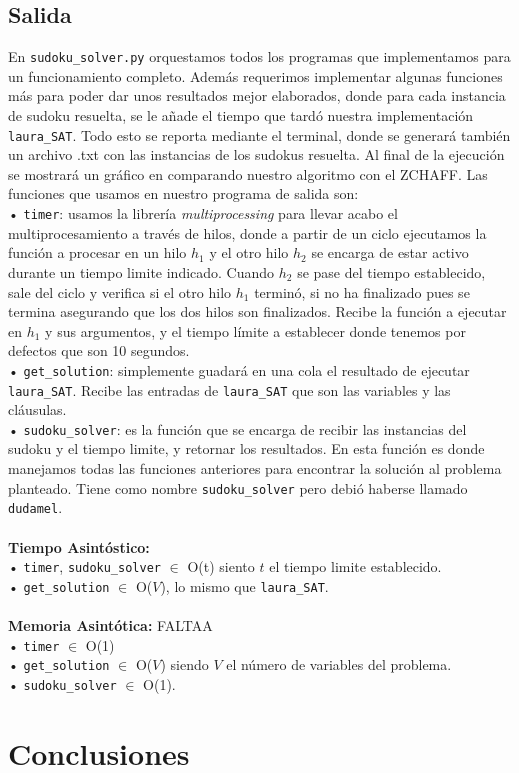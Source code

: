 \documentclass[letterpaper,12pt]{article}
\begin{document}
\subsection{Salida}

En \texttt{sudoku\_solver.py} orquestamos todos los programas que implementamos para un funcionamiento completo. Además requerimos implementar algunas funciones más para poder dar unos resultados mejor elaborados, donde para cada instancia de sudoku resuelta, se le añade el tiempo que tardó nuestra implementación \texttt{laura\_SAT}. Todo esto se reporta mediante el terminal, donde se generará también un archivo .txt con las instancias de los sudokus resuelta. Al final de la ejecución se mostrará un gráfico en comparando nuestro algoritmo con el ZCHAFF. Las funciones que usamos en nuestro programa de salida son:\\

• \texttt{timer}: usamos la librería \textit{multiprocessing} para llevar acabo el multiprocesamiento a través de hilos, donde a partir de un ciclo ejecutamos la función a procesar en un hilo $h_1$ y el otro hilo $h_2$ se encarga de estar activo durante un tiempo limite indicado. Cuando $h_2$ se pase del tiempo establecido, sale del ciclo y verifica si el otro hilo $h_1$ terminó, si no ha finalizado pues se termina asegurando que los dos hilos son finalizados. Recibe la función a ejecutar en $h_1$ y sus argumentos, y el tiempo límite a establecer donde tenemos por defectos que son 10 segundos.\\

• \texttt{get\_solution}: simplemente guadará en una cola el resultado de ejecutar \texttt{laura\_SAT}. Recibe las entradas de \texttt{laura\_SAT} que son las variables y las cláusulas.\\

• \texttt{sudoku\_solver}: es la función que se encarga de recibir las instancias del sudoku y el tiempo limite, y retornar los resultados. En esta función es donde manejamos todas las funciones anteriores para encontrar la solución al problema planteado. Tiene como nombre \texttt{sudoku\_solver} pero debió haberse llamado \texttt{dudamel}.\\
\\
\textbf{Tiempo Asintóstico:}\\

• \texttt{timer}, \texttt{sudoku\_solver} $\in$ O(t) siento $t$ el tiempo limite establecido.\\

• \texttt{get\_solution} $\in$ O($V$), lo mismo que \texttt{laura\_SAT}.\\
\\
\textbf{Memoria Asintótica:} FALTAA\\ 

• \texttt{timer} $\in$ O(1)\\

• \texttt{get\_solution} $\in$ O($V$) siendo $V$ el número de variables del problema.\\

• \texttt{sudoku\_solver} $\in$ O(1).

\section{Conclusiones}
\end{document}
